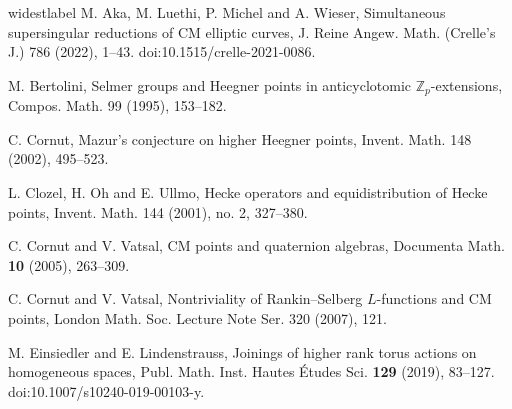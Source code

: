 \documentclass[11pt,oneside,reqno]{amsart}
\newcommand{\Z}{\mathbb{Z}}
\theoremstyle{plain}
\begin{document}
	\begin{thebibliography}{widestlabel}
		M. Aka, M. Luethi, P. Michel and A. Wieser,
		Simultaneous supersingular reductions of CM elliptic curves,
		J. Reine Angew. Math. (Crelle's J.) 786 (2022), 1--43.
		doi:10.1515/crelle-2021-0086.
		
		
		
		
		M. Bertolini,
		Selmer groups and Heegner points in anticyclotomic $\Z_p$-extensions,
		Compos. Math. 99 (1995), 153--182.
		
		
		
		
		
		
		C. Cornut,
		Mazur's conjecture on higher Heegner points,
		Invent. Math. 148 (2002), 495--523.
		
		
		
		L. Clozel, H. Oh and E. Ullmo,
		Hecke operators and equidistribution of Hecke points,
		Invent. Math. 144 (2001), no. 2, 327--380.
		
		
		
		C. Cornut and V. Vatsal,
		CM points and quaternion algebras,
		Documenta Math. \textbf{10} (2005), 263--309.
		
		
		
		
		
		C. Cornut and V. Vatsal,
		Nontriviality of Rankin--Selberg $L$-functions and CM points,
		London Math. Soc. Lecture Note Ser. 320 (2007), 121.
		
		
		
		
		
		
		
		
		
		
		
		M. Einsiedler and E. Lindenstrauss,
		Joinings of higher rank torus actions on homogeneous spaces,
		Publ. Math. Inst. Hautes \'{E}tudes Sci. \textbf{129} (2019), 83--127.
		doi:10.1007/s10240-019-00103-y.
		
		
		
		
		

\end{thebibliography}
\end{document}
